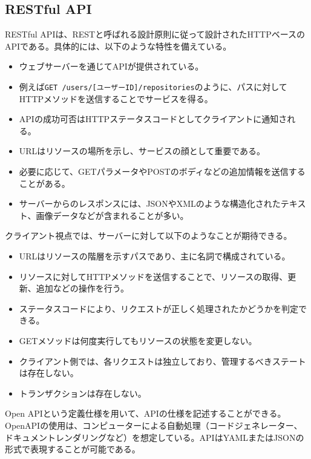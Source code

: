 \documentclass[../../../main]{subfiles}
\begin{document}
    \subsection{RESTful API}\label{subsec:phraseology-restful-api}

    RESTful APIは、RESTと呼ばれる設計原則に従って設計されたHTTPベースのAPIである。具体的には、以下のような特性を備えている。\cite{RealWorldHTTP}

    \begin{itemize}
        \item ウェブサーバーを通じてAPIが提供されている。
        \item 例えば\texttt{GET /users/[ユーザーID]/repositories}のように、パスに対してHTTPメソッドを送信することでサービスを得る。
        \item APIの成功可否はHTTPステータスコードとしてクライアントに通知される。
        \item URLはリソースの場所を示し、サービスの顔として重要である。
        \item 必要に応じて、GETパラメータやPOSTのボディなどの追加情報を送信することがある。
        \item サーバーからのレスポンスには、JSONやXMLのような構造化されたテキスト、画像データなどが含まれることが多い。
    \end{itemize}

    クライアント視点では、サーバーに対して以下のようなことが期待できる。\cite{RealWorldHTTP}

    \begin{itemize}
        \item URLはリソースの階層を示すパスであり、主に名詞で構成されている。
        \item リソースに対してHTTPメソッドを送信することで、リソースの取得、更新、追加などの操作を行う。
        \item ステータスコードにより、リクエストが正しく処理されたかどうかを判定できる。
        \item GETメソッドは何度実行してもリソースの状態を変更しない。
        \item クライアント側では、各リクエストは独立しており、管理するべきステートは存在しない。
        \item トランザクションは存在しない。
    \end{itemize}

    Open APIという定義仕様を用いて、APIの仕様を記述することができる。OpenAPIの使用は、コンピューターによる自動処理（コードジェネレーター、ドキュメントレンダリングなど）を想定している。APIはYAMLまたはJSONの形式で表現することが可能である。\cite{APIデザインパターン}
\end{document}
